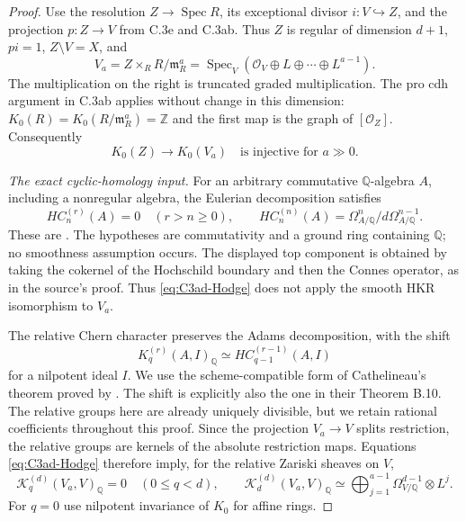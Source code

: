 \begin{proof}
Use the resolution $Z\to\operatorname{Spec}R$, its exceptional
divisor $i:V\hookrightarrow Z$, and the projection $p:Z\to V$
from C.3e and C.3ab. Thus $Z$ is regular of dimension $d+1$,
$p i=1$, $Z\setminus V=X$, and
\[
 V_a=Z\times_R R/\mathfrak m_R^a
     =\operatorname{Spec}_V
           (\mathcal O_V\oplus L\oplus\cdots\oplus L^{a-1}).
\]
The multiplication on the right is truncated graded
multiplication. The pro cdh argument in C.3ab applies without
change in this dimension: $K_0(R)=K_0(R/\mathfrak m_R^a)=\mathbb Z$
and the first map is the graph of $[\mathcal O_Z]$.
Consequently
\begin{equation}\label{eq:C3ad-finite-detection}
               K_0(Z)\longrightarrow K_0(V_a)
               \quad\text{is injective for }a\gg0.
\end{equation}

\emph{The exact cyclic-homology input.}
For an arbitrary commutative $\mathbb Q$-algebra $A$, including
a nonregular algebra, the Eulerian decomposition satisfies
\begin{equation}\label{eq:C3ad-Hodge}
 HC_n^{(r)}(A)=0\quad(r>n\ge0),\qquad
 HC_n^{(n)}(A)=\Omega^n_{A/\mathbb Q}/d\Omega^{n-1}_{A/\mathbb Q}.
\end{equation}
These are \citet[Theorems 4.6.7--4.6.8,
pp.~151--152]{D_Loday1992}. The hypotheses are commutativity
and a ground ring containing $\mathbb Q$; no smoothness
assumption occurs. The displayed top component is obtained
by taking the cokernel of the Hochschild boundary and then
the Connes operator, as in the source's proof.
Thus \eqref{eq:C3ad-Hodge} does not apply the smooth HKR
isomorphism to $V_a$.

The relative Chern character preserves the Adams decomposition,
with the shift
\[
       K_q^{(r)}(A,I)_{\mathbb Q}
                    \simeq HC_{q-1}^{(r-1)}(A,I)
\]
for a nilpotent ideal $I$. We use the scheme-compatible
form of Cathelineau's theorem proved by
\citet[Theorem 6.1 and Corollary 6.2,
author p.~15]{D_CortinasHaesemeyerWeibel2009}.
The shift is explicitly also the one in their Theorem B.10.
The relative groups here are already uniquely divisible,
but we retain rational coefficients throughout this proof.
Since the projection $V_a\to V$ splits restriction,
the relative groups are kernels of the absolute restriction
maps. Equations \eqref{eq:C3ad-Hodge} therefore imply, for
the relative Zariski sheaves on $V$,
\begin{equation}\label{eq:C3ad-relative-sheaves}
 \mathcal K_q^{(d)}(V_a,V)_{\mathbb Q}=0\quad(0\le q<d),
 \qquad
 \mathcal K_d^{(d)}(V_a,V)_{\mathbb Q}
       \simeq\bigoplus_{j=1}^{a-1}
                         \Omega^{d-1}_{V/\mathbb Q}\otimes L^j.
\end{equation}
For $q=0$ use nilpotent invariance of $K_0$ for affine rings.


\end{proof}
